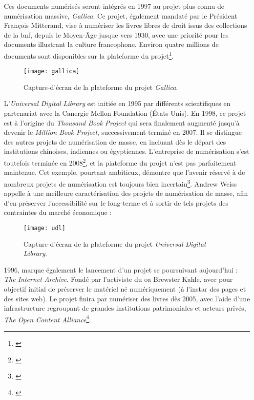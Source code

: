 Ces documents numérisés seront intégrés en 1997 au projet plus connu de numérisation massive, \textit{Gallica}. Ce projet, également mandaté par le Président François Mitterand, vise à numériser les livres libres de droit issus des collections de la \gls{bnf}, depuis le Moyen-Âge jusque vers 1930, avec une priorité pour les documents illustrant la culture francophone. Environ quatre millions de documents sont disponibles sur la plateforme du projet\footnote{\cite[p.140]{thylstrup_politics_2018}}.

\begin{figure}[H]%
\centering
\texttt{[image: gallica]}
\caption{Capture-d'écran de la plateforme du projet \textit{Gallica}.}
\end{figure}
L'\textit{Universal Digital Library} est initiée en 1995 par différents scientifiques en partenariat avec la Canergie Mellon Foundation (États-Unis). En 1998, ce projet est à l'origine du \textit{Thousand Book Project} qui sera finalement augmenté jusqu'à devenir le \textit{Million Book Project}, successivement terminé en 2007. Il se distingue des autres projets de numérisation de masse, en incluant dès le départ des institutions chinoises, indiennes ou égyptiennes. L'entreprise de numérisation s'est toutefois terminée en 2008\footnote{\cite[p.12]{thylstrup_politics_2018}}, et la plateforme du projet n'est pas parfaitement maintenue. Cet exemple, pourtant ambitieux, démontre que l'avenir réservé à de nombreux projets de numérisation est toujours bien incertain\footnote{\cite[p.12]{weiss_using_2014}}. Andrew Weiss appelle à une meilleure caractérisation des projets de numérisation de masse, afin d'en préserver l'accessibilité sur le long-terme et à sortir de tels projets des contraintes du marché économique : 

\begin{figure}[H]%
\centering
\texttt{[image: udl]}
\caption{Capture-d'écran de la plateforme du projet \textit{Universal Digital Library}.}
\end{figure}

1996, marque également le lancement d'un projet se poursuivant aujourd'hui : \textit{The Internet Archive}. Fondé par l'activiste du \gls{oa} Brewster Kahle, avec pour objectif initial de préserver le matériel né numériquement (à l'instar des pages et des sites web). Le projet finira par numériser des livres dès 2005, avec l'aide d'une infrastructure regroupant de grandes institutions patrimoniales et acteurs privés, \textit{The Open Content Alliance}\footnote{\cite[p.12]{thylstrup_politics_2018}}.

